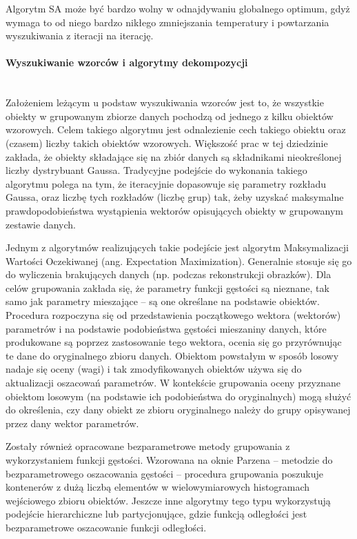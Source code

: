 \documentclass{article}
\newcommand{\myparagraph}[1]{\paragraph{#1}\mbox{}\\}
\begin{document}
Algorytm SA może być bardzo wolny w odnajdywaniu globalnego optimum, gdyż wymaga to od niego bardzo nikłego zmniejszania temperatury i powtarzania wyszukiwania z iteracji na iterację.

\myparagraph{Wyszukiwanie wzorców i algorytmy dekompozycji}

Założeniem leżącym u podstaw wyszukiwania wzorców jest to, że wszystkie obiekty w grupowanym zbiorze danych pochodzą od jednego z kilku obiektów wzorowych. Celem takiego algorytmu jest odnalezienie cech takiego obiektu oraz (czasem) liczby takich obiektów wzorowych. Większość prac w tej dziedzinie zakłada, że obiekty składające się na zbiór danych są składnikami nieokreślonej liczby dystrybuant Gaussa. Tradycyjne podejście do wykonania takiego algorytmu polega na tym, że iteracyjnie dopasowuje się parametry rozkładu Gaussa, oraz liczbę tych rozkładów (liczbę grup) tak, żeby uzyskać maksymalne prawdopodobieństwa wystąpienia wektorów opisujących obiekty w grupowanym zestawie danych.

Jednym z algorytmów realizujących takie podejście jest algorytm Maksymalizacji Wartości Oczekiwanej (ang. Expectation Maximization). Generalnie stosuje się go do wyliczenia brakujących danych (np. podczas rekonstrukcji obrazków). Dla celów grupowania zakłada się, że parametry funkcji gęstości są nieznane, tak samo jak parametry mieszające – są one określane na podstawie obiektów. Procedura rozpoczyna się od przedstawienia początkowego wektora (wektorów) parametrów i na podstawie podobieństwa gęstości mieszaniny danych, które produkowane są poprzez zastosowanie tego wektora, ocenia się go przyrównując te dane do oryginalnego zbioru danych. Obiektom powstałym w sposób losowy nadaje się oceny (wagi) i tak zmodyfikowanych obiektów używa się do aktualizacji oszacowań parametrów. W kontekście grupowania oceny przyznane obiektom losowym (na podstawie ich podobieństwa do oryginalnych) mogą służyć do określenia, czy dany obiekt ze zbioru oryginalnego należy do grupy opisywanej przez dany wektor parametrów.

Zostały również opracowane bezparametrowe metody grupowania z wykorzystaniem funkcji gęstości. Wzorowana na oknie Parzena – metodzie do bezparametrowego oszacowania gęstości – procedura grupowania poszukuje kontenerów z dużą liczbą elementów w wielowymiarowych histogramach wejściowego zbioru obiektów. Jeszcze inne algorytmy tego typu wykorzystują podejście hierarchiczne lub partycjonujące, gdzie funkcją odległości jest bezparametrowe oszacowanie funkcji odległości. 
\end{document}
